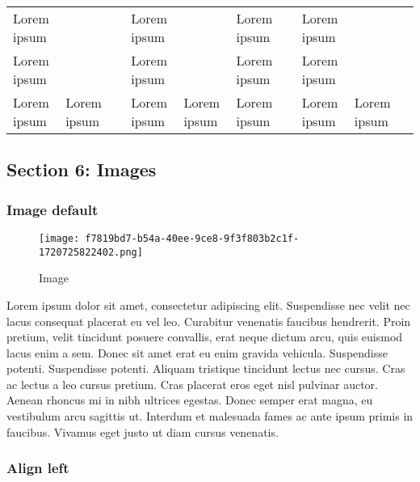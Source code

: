 \documentclass{article}
\begin{document}
\begin{tabularx}{\textwidth}{|X|X|X|X|X|X|X|X|X|X|}
 &

 \\\hline
Lorem ipsum
 &

 &

 &
Lorem ipsum
 &

 &
Lorem ipsum
 &

 &
Lorem ipsum
 &

 &

 \\\hline
Lorem ipsum
 &

 &

 &
Lorem ipsum
 &

 &
Lorem ipsum
 &

 &
Lorem ipsum
 &

 &

 \\\hline
Lorem ipsum
 &
Lorem ipsum
 &

 &
Lorem ipsum
 &
Lorem ipsum
 &
Lorem ipsum
 &

 &
Lorem ipsum
 &
Lorem ipsum
 &

 \\\hline
\end{tabularx}
\subsection*{Section 6: Images}\subsubsection*{Image default}
\begin{figure}[h]
\centering
\texttt{[image: f7819bd7-b54a-40ee-9ce8-9f3f803b2c1f-1720725822402.png]}
\caption{Image}
\end{figure}

Lorem ipsum dolor sit amet, consectetur adipiscing elit. Suspendisse nec velit nec lacus consequat placerat eu vel leo. Curabitur venenatis faucibus hendrerit. Proin pretium, velit tincidunt posuere convallis, erat neque dictum arcu, quis euismod lacus enim a sem. Donec sit amet erat eu enim gravida vehicula. Suspendisse potenti. Suspendisse potenti. Aliquam tristique tincidunt lectus nec cursus. Cras ac lectus a leo cursus pretium. Cras placerat eros eget nisl pulvinar auctor. Aenean rhoncus mi in nibh ultrices egestas. Donec semper erat magna, eu vestibulum arcu sagittis ut. Interdum et malesuada fames ac ante ipsum primis in faucibus. Vivamus eget justo ut diam cursus venenatis.


\subsubsection*{Align left}
\end{document}
